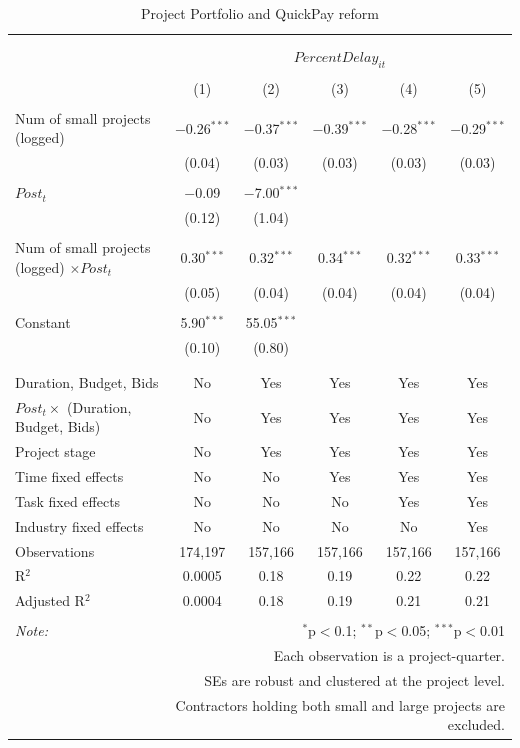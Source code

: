 \documentclass[
]{article}
\begin{document}
\begin{table}[H] \centering 
  \caption{Project Portfolio and QuickPay reform} 
  \label{} 
\small 
\begin{tabular}{@{\extracolsep{-10pt}}lccccc} 
\\[-1.8ex]\hline 
\hline \\[-1.8ex] 
\\[-1.8ex] & \multicolumn{5}{c}{$PercentDelay_{it}$} \\ 
\\[-1.8ex] & (1) & (2) & (3) & (4) & (5)\\ 
\hline \\[-1.8ex] 
 Num of small projects (logged) & $-$0.26$^{***}$ & $-$0.37$^{***}$ & $-$0.39$^{***}$ & $-$0.28$^{***}$ & $-$0.29$^{***}$ \\ 
  & (0.04) & (0.03) & (0.03) & (0.03) & (0.03) \\ 
  & & & & & \\ 
 $Post_t$ & $-$0.09 & $-$7.00$^{***}$ &  &  &  \\ 
  & (0.12) & (1.04) &  &  &  \\ 
  & & & & & \\ 
 Num of small projects (logged) $\times Post_t$ & 0.30$^{***}$ & 0.32$^{***}$ & 0.34$^{***}$ & 0.32$^{***}$ & 0.33$^{***}$ \\ 
  & (0.05) & (0.04) & (0.04) & (0.04) & (0.04) \\ 
  & & & & & \\ 
 Constant & 5.90$^{***}$ & 55.05$^{***}$ &  &  &  \\ 
  & (0.10) & (0.80) &  &  &  \\ 
  & & & & & \\ 
\hline \\[-1.8ex] 
Duration, Budget, Bids & No & Yes & Yes & Yes & Yes \\ 
$Post_t \times $  (Duration, Budget, Bids) & No & Yes & Yes & Yes & Yes \\ 
Project stage & No & Yes & Yes & Yes & Yes \\ 
Time fixed effects & No & No & Yes & Yes & Yes \\ 
Task fixed effects & No & No & No & Yes & Yes \\ 
Industry fixed effects & No & No & No & No & Yes \\ 
Observations & 174,197 & 157,166 & 157,166 & 157,166 & 157,166 \\ 
R$^{2}$ & 0.0005 & 0.18 & 0.19 & 0.22 & 0.22 \\ 
Adjusted R$^{2}$ & 0.0004 & 0.18 & 0.19 & 0.21 & 0.21 \\ 
\hline 
\hline \\[-1.8ex] 
\textit{Note:}  & \multicolumn{5}{r}{$^{*}$p$<$0.1; $^{**}$p$<$0.05; $^{***}$p$<$0.01} \\ 
 & \multicolumn{5}{r}{Each observation is a project-quarter.} \\ 
 & \multicolumn{5}{r}{SEs are robust and clustered at the project level.} \\ 
 & \multicolumn{5}{r}{Contractors holding both small and large projects are excluded.} \\ 
\end{tabular} 
\end{table}
\end{document}
